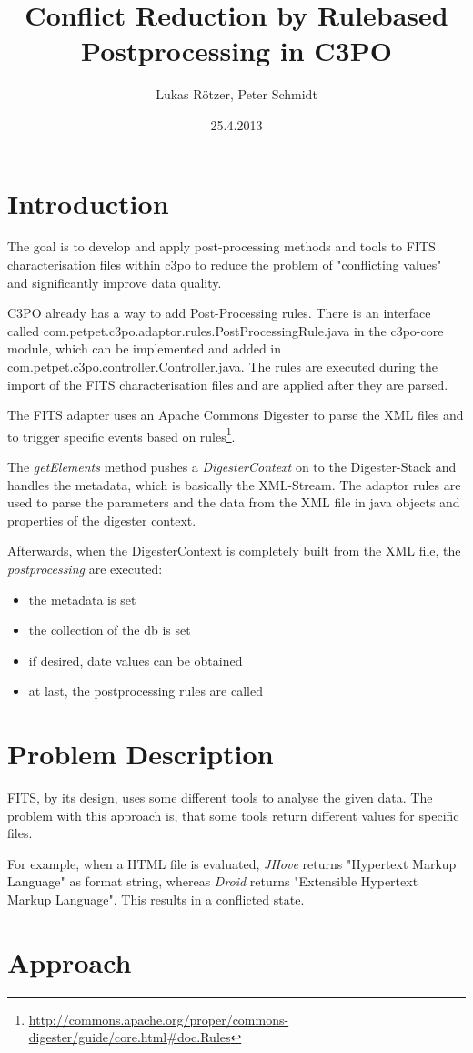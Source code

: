 \documentclass[a4paper,10pt]{article}
\title{Conflict Reduction by Rulebased Postprocessing in C3PO}
\author{Lukas Rötzer, Peter Schmidt}
\date{25.4.2013}
\begin{document}
\maketitle
\clearpage

\section{Introduction}

The goal is to develop and apply post-processing methods and tools to FITS characterisation files within c3po to reduce the problem of "conflicting values" and significantly improve data quality. 

C3PO already has a way to add Post-Processing rules. There is an interface called com.petpet.c3po.adaptor.rules.PostProcessingRule.java in the c3po-core module, which can be implemented and added in com.petpet.c3po.controller.Controller.java. The rules are executed during the import of the FITS characterisation files and are applied after they are parsed.

The FITS adapter uses an Apache Commons Digester to parse the XML files and to trigger specific events based on rules\footnote{\url{http://commons.apache.org/proper/commons-digester/guide/core.html\#doc.Rules}}.

The \emph{getElements} method pushes a \emph{DigesterContext} on to the Digester-Stack and handles the metadata, which is basically the XML-Stream.
The adaptor rules are used to parse the parameters and the data from the XML file in java objects and properties of the digester context.

Afterwards, when the DigesterContext is completely built from the XML file, the \emph{postprocessing} are executed:
\begin{itemize}
\item the metadata is set
\item the collection of the db is set
\item if desired, date values can be obtained
\item at last, the postprocessing rules are called
\end{itemize}

\section{Problem Description}

FITS, by its design, uses some different tools to analyse the given data. The problem with this approach is, that some tools return different values for specific files.

For example, when a HTML file is evaluated, \emph{JHove} returns "Hypertext Markup Language" as format string, whereas \emph{Droid} returns "Extensible Hypertext Markup Language". This results in a conflicted state.

\section{Approach}
\end{document}

